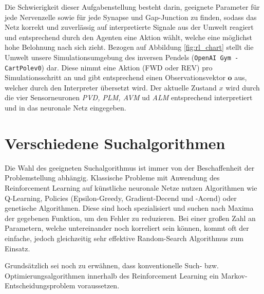 	Die Schwierigkeit dieser Aufgabenstellung besteht darin, geeignete Parameter für jede Nervenzelle sowie für jede Synapse und Gap-Junction zu finden, sodass das Netz korrekt und zuverlässig auf interpretierte Signale aus der Umwelt reagiert und entsprechend durch den Agenten eine Aktion wählt, welche eine möglichst hohe Belohnung nach sich zieht. Bezogen auf Abbildung \ref{fig:rl_chart} stellt die Umwelt unsere Simulationsumgebung des inversen Pendels (\texttt{OpenAI Gym - CartPolev0}) dar. Diese nimmt eine Aktion (FWD oder REV) pro Simulationsschritt an und gibt entsprechend einen Observationsvektor $\textbf{o}$ aus, welcher durch den Interpreter übersetzt wird. Der aktuelle Zustand $x$ wird durch die vier Sensorneuronen \textit{PVD, PLM, AVM} ud \textit{ALM} entsprechend interpretiert und in das neuronale Netz eingegeben.

\section{Verschiedene Suchalgorithmen}
\label{sec:rl_alt}
	Die Wahl des geeigneten Suchalgorithmus ist immer von der Beschaffenheit der Problemstellung abhängig. Klassische Probleme mit Anwendung des Reinforcement Learning auf künstliche neuronale Netze nutzen Algorithmen wie Q-Learning, Policies (Epsilon-Greedy, Gradient-Decend und -Acend) oder genetische Algorithmen. Diese sind hoch spezialisiert und suchen nach Maxima der gegebenen Funktion, um den Fehler zu reduzieren. Bei einer großen Zahl an Parametern, welche untereinander noch korreliert sein können, kommt oft der einfache, jedoch gleichzeitig sehr effektive \glqq Random-Search\grqq{} Algorithmus zum Einsatz.
	
	Grundsätzlich sei noch zu erwähnen, dass konventionelle Such- bzw. Optimierungsalgorithmen innerhalb des Reinforcement Learning ein Markov-Entscheidungsproblem voraussetzen. 
